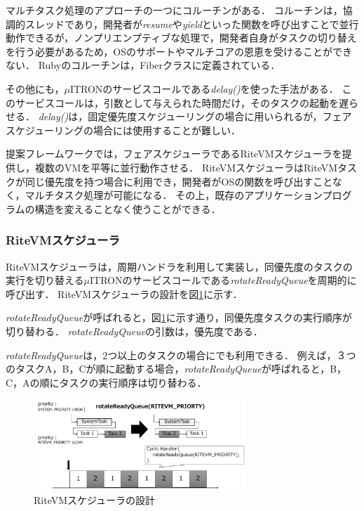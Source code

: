 \documentclass[submit,techrep]{ipsj}
\begin{document}
マルチタスク処理のアプローチの一つにコルーチンがある．
コルーチンは，協調的スレッドであり，開発者が{\it resume}や{\it yield}といった関数を呼び出すことで並行動作できるが，ノンプリエンプティブな処理で，開発者自身がタスクの切り替えを行う必要があるため，OSのサポートやマルチコアの恩恵を受けることができない．
Rubyのコルーチンは，Fiberクラス\cite{url:co-routine}に定義されている．

その他にも，$\mu$ITRONのサービスコールである{\it delay()}を使った手法がある．
このサービスコールは，引数として与えられた時間だけ，そのタスクの起動を遅らせる．
{\it delay()}は，固定優先度スケジューリングの場合に用いられるが，フェアスケジューリングの場合には使用することが難しい．

提案フレームワークでは，フェアスケジューラであるRiteVMスケジューラを提供し，複数のVMを平等に並行動作させる．
RiteVMスケジューラはRiteVMタスクが同じ優先度を持つ場合に利用でき，開発者がOSの関数を呼び出すことなく，マルチタスク処理が可能になる．
その上，既存のアプリケーションプログラムの構造を変えることなく使うことができる． 

\subsubsection{RiteVMスケジューラ}
RiteVMスケジューラは，周期ハンドラを利用して実装し，同優先度のタスクの実行を切り替える$\mu$ITRONのサービスコールである{\it rotateReadyQueue}を周期的に呼び出す．
RiteVMスケジューラの設計を図\ref{fig:rotateReadyQueue}に示す．


{\it rotateReadyQueue}が呼ばれると，図\ref{fig:rotateReadyQueue}に示す通り，同優先度タスクの実行順序が切り替わる．
{\it rotateReadyQueue}の引数は，優先度である．

{\it rotateReadyQueue}は，2つ以上のタスクの場合にでも利用できる．
例えば，３つのタスクA，B，Cが順に起動する場合，{\it rotateReadyQueue}が呼ばれると，B，C，Aの順にタスクの実行順序は切り替わる．

\begin{figure}[t]
    \centering
    \includegraphics[width=8cm,clip]{../EMSOFT2016/figure/rotateReadyQueue.pdf}
    \vspace{-2mm}
    \caption{RiteVMスケジューラの設計}
\vspace{-5mm}
    \label{fig:rotateReadyQueue}
\end{figure} 
 
\end{document}

